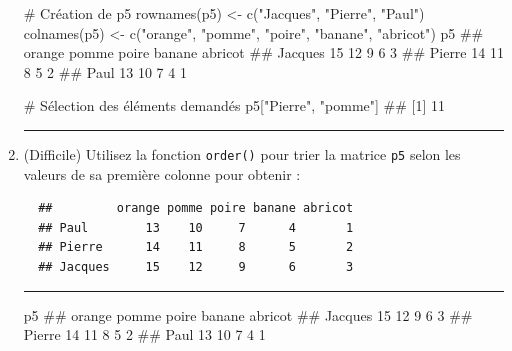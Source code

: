 \documentclass[12pt,twosided, notitlepage]{book}
\newenvironment{Shaded}{}{}
\newcommand{\KeywordTok}[1]{\textcolor[rgb]{0.00,0.00,1.00}{#1}}
\newcommand{\StringTok}[1]{\textcolor[rgb]{0.00,0.50,0.50}{#1}}
\newcommand{\CommentTok}[1]{\textcolor[rgb]{0.00,0.50,0.00}{#1}}
\newcommand{\NormalTok}[1]{#1}
\newif \ifsol
\renewenvironment{Shaded}{\begin{snugshade}}{\end{snugshade}}
\begin{document}
\begin{enumerate}
\begin{Shaded}
\begin{Highlighting}[]
\CommentTok{# Création de p5}
\KeywordTok{rownames}\NormalTok{(p5) <-}\StringTok{ }\KeywordTok{c}\NormalTok{(}\StringTok{"Jacques"}\NormalTok{, }\StringTok{"Pierre"}\NormalTok{, }\StringTok{"Paul"}\NormalTok{)}
\KeywordTok{colnames}\NormalTok{(p5) <-}\StringTok{ }\KeywordTok{c}\NormalTok{(}\StringTok{"orange"}\NormalTok{, }\StringTok{"pomme"}\NormalTok{, }\StringTok{"poire"}\NormalTok{, }\StringTok{"banane"}\NormalTok{, }\StringTok{"abricot"}\NormalTok{)}
\NormalTok{p5}
\NormalTok{  ##         orange pomme poire banane abricot}
\NormalTok{  ## Jacques     15    12     9      6       3}
\NormalTok{  ## Pierre      14    11     8      5       2}
\NormalTok{  ## Paul        13    10     7      4       1}

\CommentTok{# Sélection des éléments demandés}
\NormalTok{p5[}\StringTok{"Pierre"}\NormalTok{, }\StringTok{"pomme"}\NormalTok{]}
\NormalTok{  ## [1] 11}
\end{Highlighting}
\end{Shaded}

  \begin{center} \rule{0.5\linewidth}{\linethickness}\end{center}

  \bigskip  \fi 
\item
  (Difficile) Utilisez la fonction
  \texttt{order()} pour trier la matrice
  \texttt{p5} selon les valeurs de sa première colonne pour obtenir :

\begin{verbatim}
  ##         orange pomme poire banane abricot
  ## Paul        13    10     7      4       1
  ## Pierre      14    11     8      5       2
  ## Jacques     15    12     9      6       3
\end{verbatim}

  \ifsol  \textbf{Indication} Que vaut \texttt{p5{[}c(3,\ 2,\ 1),\ {]}}
  ? Comment utiliser la fonction \texttt{order()} pour automatiser cette
  opération ?\fi  \ifsol 

  \begin{center} \rule{0.5\linewidth}{\linethickness}\end{center}

\begin{Shaded}
\begin{Highlighting}[]
\NormalTok{p5}
\NormalTok{  ##         orange pomme poire banane abricot}
\NormalTok{  ## Jacques     15    12     9      6       3}
\NormalTok{  ## Pierre      14    11     8      5       2}
\NormalTok{  ## Paul        13    10     7      4       1}


\end{Highlighting}
\end{Shaded}
\end{enumerate}
\end{document}
